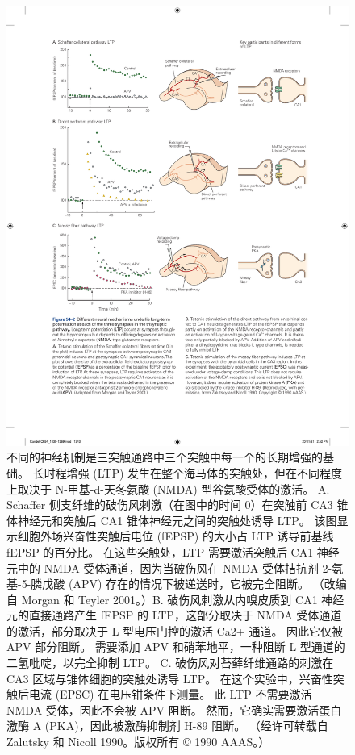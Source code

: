 \begin{figure}[htbp]
	\centering
	\includegraphics[width=0.9\linewidth]{chap54/fig_54_2}
	\caption{不同的神经机制是三突触通路中三个突触中每一个的长期增强的基础。 长时程增强 (LTP) 发生在整个海马体的突触处，但在不同程度上取决于 N-甲基-d-天冬氨酸 (NMDA) 型谷氨酸受体的激活。 A. Schaffer 侧支纤维的破伤风刺激（在图中的时间 0）在突触前 CA3 锥体神经元和突触后 CA1 锥体神经元之间的突触处诱导 LTP。 该图显示细胞外场兴奋性突触后电位 (fEPSP) 的大小占 LTP 诱导前基线 fEPSP 的百分比。 在这些突触处，LTP 需要激活突触后 CA1 神经元中的 NMDA 受体通道，因为当破伤风在 NMDA 受体拮抗剂 2-氨基-5-膦戊酸 (APV) 存在的情况下被递送时，它被完全阻断。 （改编自 Morgan 和 Teyler 2001。）B. 破伤风刺激从内嗅皮质到 CA1 神经元的直接通路产生 fEPSP 的 LTP，这部分取决于 NMDA 受体通道的激活，部分取决于 L 型电压门控的激活 Ca2+ 通道。 因此它仅被 APV 部分阻断。 需要添加 APV 和硝苯地平，一种阻断 L 型通道的二氢吡啶，以完全抑制 LTP。 C. 破伤风对苔藓纤维通路的刺激在 CA3 区域与锥体细胞的突触处诱导 LTP。 在这个实验中，兴奋性突触后电流 (EPSC) 在电压钳条件下测量。 此 LTP 不需要激活 NMDA 受体，因此不会被 APV 阻断。 然而，它确实需要激活蛋白激酶 A (PKA)，因此被激酶抑制剂 H-89 阻断。 （经许可转载自 Zalutsky 和 Nicoll 1990。版权所有 © 1990 AAAS。）}
	\label{fig:54_2}
\end{figure}

